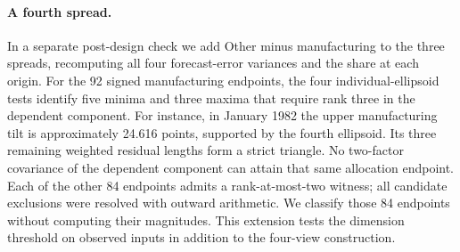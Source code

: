 \paragraph{A fourth spread.}
In a separate post-design check we add Other minus manufacturing to the three spreads, recomputing all four forecast-error variances and the share at each origin. For the 92 signed manufacturing endpoints, the four individual-ellipsoid tests identify five minima and three maxima that require rank three in the dependent component. For instance, in January 1982 the upper manufacturing tilt is approximately 24.616 points, supported by the fourth ellipsoid. Its three remaining weighted residual lengths form a strict triangle. No two-factor covariance of the dependent component can attain that same allocation endpoint. Each of the other 84 endpoints admits a rank-at-most-two witness; all candidate exclusions were resolved with outward arithmetic. We classify those 84 endpoints without computing their magnitudes. This extension tests the dimension threshold on observed inputs in addition to the four-view construction.
